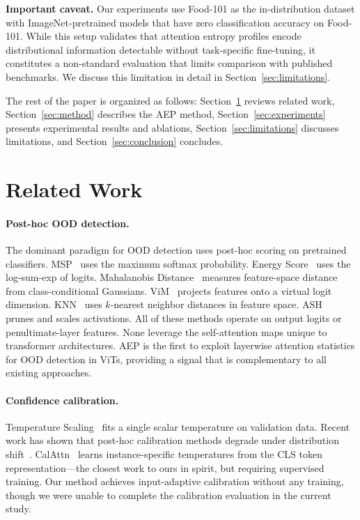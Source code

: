 \documentclass{article}
\newcommand{\AEP}{\textsc{AEP}}
\begin{document}
\textbf{Important caveat.} Our experiments use Food-101 as the in-distribution dataset with ImageNet-pretrained models that have zero classification accuracy on Food-101. While this setup validates that attention entropy profiles encode distributional information detectable without task-specific fine-tuning, it constitutes a non-standard evaluation that limits comparison with published benchmarks. We discuss this limitation in detail in Section~\ref{sec:limitations}.

The rest of the paper is organized as follows: Section~\ref{sec:related} reviews related work, Section~\ref{sec:method} describes the \AEP{} method, Section~\ref{sec:experiments} presents experimental results and ablations, Section~\ref{sec:limitations} discusses limitations, and Section~\ref{sec:conclusion} concludes.

\section{Related Work}
\label{sec:related}

\paragraph{Post-hoc OOD detection.}
The dominant paradigm for OOD detection uses post-hoc scoring on pretrained classifiers. MSP~\citep{hendrycks2017baseline} uses the maximum softmax probability. Energy Score~\citep{liu2020energy} uses the log-sum-exp of logits. Mahalanobis Distance~\citep{lee2018simple} measures feature-space distance from class-conditional Gaussians. ViM~\citep{wang2022vim} projects features onto a virtual logit dimension. KNN~\citep{sun2022out} uses $k$-nearest neighbor distances in feature space. ASH~\citep{djurisic2023extremely} prunes and scales activations. All of these methods operate on output logits or penultimate-layer features. None leverage the self-attention maps unique to transformer architectures. \AEP{} is the first to exploit layerwise attention statistics for OOD detection in ViTs, providing a signal that is complementary to all existing approaches.

\paragraph{Confidence calibration.}
Temperature Scaling~\citep{guo2017calibration} fits a single scalar temperature on validation data. Recent work has shown that post-hoc calibration methods degrade under distribution shift~\citep{ovadia2019trust}. CalAttn~\citep{liang2025calattn} learns instance-specific temperatures from the CLS token representation---the closest work to ours in spirit, but requiring supervised training. Our method achieves input-adaptive calibration without any training, though we were unable to complete the calibration evaluation in the current study.
\end{document}
